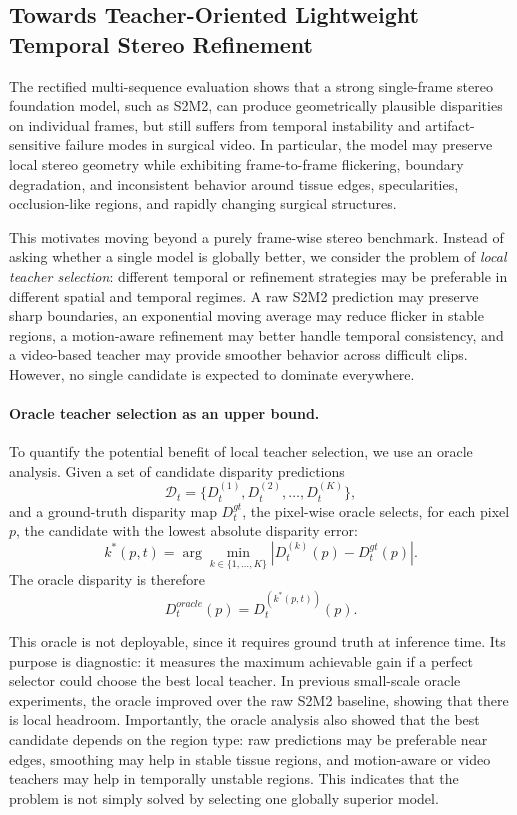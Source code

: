 \documentclass[11pt,a4paper]{article}
\begin{document}
\subsection{Towards Teacher-Oriented Lightweight Temporal Stereo Refinement}

The rectified multi-sequence evaluation shows that a strong single-frame stereo
foundation model, such as S2M2, can produce geometrically plausible disparities on
individual frames, but still suffers from temporal instability and artifact-sensitive
failure modes in surgical video. In particular, the model may preserve local
stereo geometry while exhibiting frame-to-frame flickering, boundary degradation,
and inconsistent behavior around tissue edges, specularities, occlusion-like
regions, and rapidly changing surgical structures.

This motivates moving beyond a purely frame-wise stereo benchmark. Instead of
asking whether a single model is globally better, we consider the problem of
\emph{local teacher selection}: different temporal or refinement strategies may be
preferable in different spatial and temporal regimes. A raw S2M2 prediction may
preserve sharp boundaries, an exponential moving average may reduce flicker in
stable regions, a motion-aware refinement may better handle temporal consistency,
and a video-based teacher may provide smoother behavior across difficult clips.
However, no single candidate is expected to dominate everywhere.

\paragraph{Oracle teacher selection as an upper bound.}
To quantify the potential benefit of local teacher selection, we use an oracle
analysis. Given a set of candidate disparity predictions
\[
\mathcal{D}_t = \{D_t^{(1)}, D_t^{(2)}, \ldots, D_t^{(K)}\},
\]
and a ground-truth disparity map $D_t^{gt}$, the pixel-wise oracle selects, for
each pixel $p$, the candidate with the lowest absolute disparity error:
\[
k^*(p,t) =
\arg\min_{k \in \{1,\ldots,K\}}
\left|D_t^{(k)}(p) - D_t^{gt}(p)\right|.
\]
The oracle disparity is therefore
\[
D_t^{oracle}(p) = D_t^{(k^*(p,t))}(p).
\]

This oracle is not deployable, since it requires ground truth at inference time.
Its purpose is diagnostic: it measures the maximum achievable gain if a perfect
selector could choose the best local teacher. In previous small-scale oracle
experiments, the oracle improved over the raw S2M2 baseline, showing that there
is local headroom. Importantly, the oracle analysis also showed that the best
candidate depends on the region type: raw predictions may be preferable near
edges, smoothing may help in stable tissue regions, and motion-aware or video
teachers may help in temporally unstable regions. This indicates that the problem
is not simply solved by selecting one globally superior model.
\end{document}
